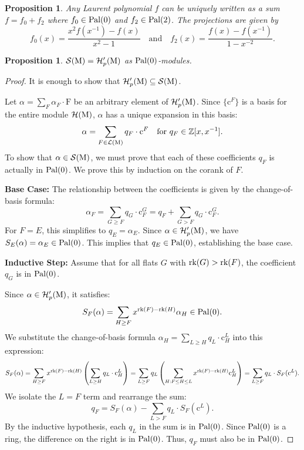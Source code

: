 \documentclass[11pt]{article}
\newcommand{\calL}{\mathcal{L}}
\newcommand{\calH}{\mathcal{H}}
\newcommand{\calS}{\mathcal{S}}
\newcommand{\rank}{\normalfont\text{rk}}
\newcommand{\M}{\normalfont\text{M}}
\newcommand{\ZZ}{\mathbb{Z}}
\newcommand{\Ebasis}[1]{\mathrm{#1}}
\newcommand{\Cbasis}[1]{\mathrm{c}^{#1}}
\newcommand{\CbasisSub}[2]{\mathrm{c}^{#1}_{#2}}
\newcommand{\pal}{\normalfont\text{Pal}}
\newtheorem{proposition}[theorem]{Proposition}
\theoremstyle{remark}
\begin{document}
\begin{proposition}\label{prop:LPDecomposition}
    Any Laurent polynomial \(f\) can be uniquely written as a sum \(f = f_0 + f_2\) where
    \(f_0 \in \pal(0)\) and \(f_2 \in \pal(2)\). The projections are given by
    \[ f_0(x) = \frac{x^2 f(x^{-1}) - f(x)}{x^2 - 1} \quad \text{and} \quad f_2(x) = \frac{f(x) - f(x^{-1})}{1 - x^{-2}}. \]
\end{proposition}

\begin{proposition}\label{prop:SisHp}
    \(\calS(\M) = \calH'_p(\M)\) as \(\pal(0)\)-modules.
\end{proposition}
\begin{proof}
    It is enough to show that \(\calH'_p(\M) \subseteq \calS(\M)\).

    Let \(\alpha = \sum_F \alpha_F \cdot \Ebasis{F}\) be an arbitrary element of \(\calH'_p(\M)\). Since \(\{\Cbasis{F}\}\) is a basis for the entire module \(\calH(\M)\), \(\alpha\) has a unique expansion in this basis:
    \[ \alpha = \sum_{F \in \calL(\M)} q_F \cdot \Cbasis{F}\quad \text{for } q_F \in \ZZ[x, x^{-1}]. \]
    To show that \(\alpha \in \calS(\M)\), we must prove that each of these coefficients \(q_F\) is actually in
    \(\pal(0)\). We prove this by induction on the corank of \(F\).

    \textbf{Base Case:} The relationship between the coefficients is given by the change-of-basis formula:
    \[ \alpha_F = \sum_{G \ge F} q_G \cdot \CbasisSub{G}{F} = q_F + \sum_{G > F} q_G \cdot \CbasisSub{G}{F}. \]
    For \(F=E\), this simplifies to \(q_E = \alpha_E\). Since \(\alpha \in \calH'_p(\M)\),
    we have \(S_E(\alpha) = \alpha_E \in \pal(0)\). This implies that \(q_E \in \pal(0)\), establishing the base case.

    \textbf{Inductive Step:} Assume that for all flats \(G\) with \(\rank(G) > \rank(F)\),
    the coefficient \(q_G\) is in \(\pal(0)\).

    Since \(\alpha \in \calH'_p(\M)\), it satisfies:
    \[ S_F(\alpha) = \sum_{H \ge F} x^{\rank(F)-\rank(H)} \alpha_H \in \pal(0). \]
    We substitute the change-of-basis formula \(\alpha_H = \sum_{L \ge H} q_L \cdot \CbasisSub{L}{H}\) into this expression:
    \[ S_F(\alpha) = \sum_{H \ge F} x^{\rank(F)-\rank(H)} \left( \sum_{L \ge H} q_L \cdot \CbasisSub{L}{H} \right)
        = \sum_{L \ge F} q_L \left( \sum_{H: F \le H \le L} x^{\rank(F)-\rank(H)} \CbasisSub{L}{H} \right)
        = \sum_{L \ge F} q_L \cdot S_F(\Cbasis{L}). \]
    We isolate the \(L=F\) term and rearrange the sum:
    \[ q_F = S_F(\alpha) - \sum_{L > F} q_L \cdot S_F(\Cbasis{L}). \]
    By the inductive hypothesis, each \(q_L\) in the sum is in \(\pal(0)\).
    Since \(\pal(0)\) is a ring, the difference on the right is in \(\pal(0)\).
    Thus, \(q_F\) must also be in \(\pal(0)\).
\end{proof}
\end{document}
